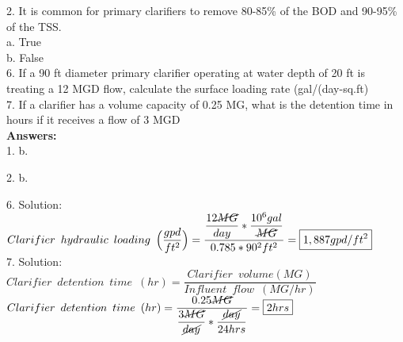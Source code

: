 \vspace{0.3cm}
2. It is common for primary clarifiers to remove 80-85\% of the BOD and 90-95\% of the TSS.\\

a. True \\
b. False \\


6. If a 90 ft diameter primary clarifier operating at water depth of 20 ft is treating a 12 MGD flow, calculate the surface loading rate (gal/(day-sq.ft)\\


\vspace{0.3cm}
7. If a clarifier has a volume capacity of 0.25 MG, what is the detention time in hours if it receives a flow of 3 MGD\\

\textbf{Answers:}\\
1.	b.  
\vspace{0.3cm}

2.	b.  

\vspace{0.3cm}

6.	Solution:\\
\vspace{0.3cm}
$Clarifier \enspace hydraulic \enspace loading \enspace 	\Big(\dfrac{gpd}{ft^2}\Big) =\dfrac{\dfrac{12\cancel{MG}}{{day}}*\dfrac{10^6gal}{\cancel{MG}}}{0.785*90^2 ft^2}=\boxed{1,887gpd/ft^2}$\\

\vspace{0.3cm}
7.	Solution:\\
\vspace{0.3cm}
$Clarifier \enspace detention \enspace time \enspace (hr) = 	\dfrac{ Clarifier \enspace volume (MG)}{Influent \enspace flow \enspace (MG/hr)}$\\
\vspace{0.5cm}
$Clarifier \enspace detention \enspace time \enspace (hr) = 	\dfrac{0.25\cancel{MG}}{\dfrac{3\cancel{MG}}{\cancel{day}}*\dfrac{\cancel{day}}{24hrs}}=\boxed{2hrs}$\\




%

